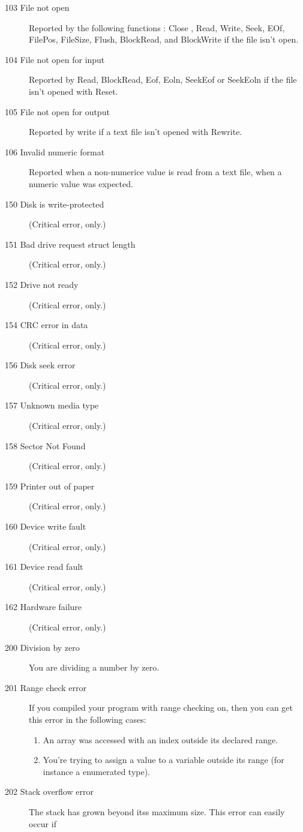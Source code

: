 \documentclass{report}
\begin{document}
\begin{description}
\item [103  File not open]
Reported by the following functions : Close , Read, Write, Seek,
EOf, FilePos, FileSize, Flush, BlockRead, and BlockWrite if the file isn't
open.
\item [104  File not open for input]
Reported by Read, BlockRead, Eof, Eoln, SeekEof or SeekEoln if the file
isn't opened with Reset.
\item [105  File not open for output]
Reported by write if a text file isn't opened with Rewrite.
\item [106  Invalid numeric format]
Reported when a non-numerice value is read from a text file, when a numeric
value was expected.
\item [150  Disk is write-protected]
(Critical error, \dos only.) 
\item [151  Bad drive request struct length]
(Critical error, \dos only.) 
\item [152  Drive not ready]
(Critical error, \dos only.) 
\item [154  CRC error in data]
(Critical error, \dos only.) 
\item [156  Disk seek error]
(Critical error, \dos only.) 
\item [157  Unknown media type]
(Critical error, \dos only.) 
\item [158  Sector Not Found]
(Critical error, \dos only.) 
\item [159  Printer out of paper]
(Critical error, \dos only.) 
\item [160  Device write fault]
(Critical error, \dos only.) 
\item [161  Device read fault]
(Critical error, \dos only.) 
\item [162  Hardware failure]
(Critical error, \dos only.) 
\item [200  Division by zero]
You are dividing a number by zero.
\item [201  Range check error]
If you compiled your program with range checking on, then you can get this
error in the following cases:
\begin{enumerate}
\item An array was accessed with an index outside its declared range.
\item You're trying to assign a value to a variable outside its range (for
instance a enumerated type).
\end{enumerate} 
\item [202  Stack overflow error]
The stack has grown beyond itss maximum size. This error can easily occur if

\end{description}
\end{document}

